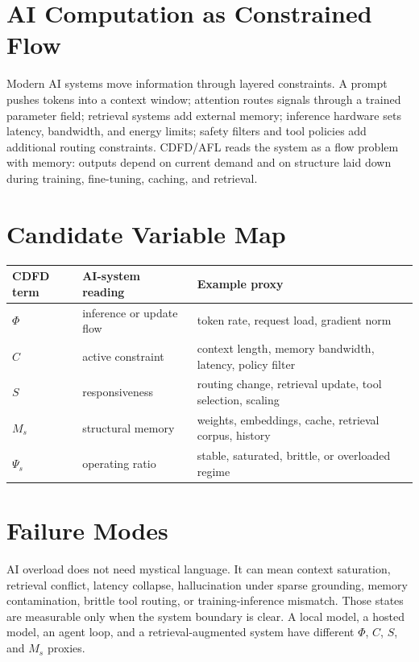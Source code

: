 \documentclass[12pt,a4paper]{article}
\begin{document}
\section{AI Computation as Constrained Flow}

Modern AI systems move information through layered constraints. A prompt pushes
tokens into a context window; attention routes signals through a trained
parameter field; retrieval systems add external memory; inference hardware sets
latency, bandwidth, and energy limits; safety filters and tool policies add
additional routing constraints. CDFD/AFL reads the system as a flow problem with
memory: outputs depend on current demand and on structure laid down during
training, fine-tuning, caching, and retrieval.

\section{Candidate Variable Map}

\begin{table}[h]
\centering
\begin{tabularx}{\textwidth}{@{}lXX@{}}
\toprule
CDFD term & AI-system reading & Example proxy \\
\midrule
$\Phi$ & inference or update flow & token rate, request load, gradient norm \\
$C$ & active constraint & context length, memory bandwidth, latency, policy filter \\
$S$ & responsiveness & routing change, retrieval update, tool selection, scaling \\
$M_s$ & structural memory & weights, embeddings, cache, retrieval corpus, history \\
$\Psi_s$ & operating ratio & stable, saturated, brittle, or overloaded regime \\
\bottomrule
\end{tabularx}
\end{table}

\section{Failure Modes}

AI overload does not need mystical language. It can mean context saturation,
retrieval conflict, latency collapse, hallucination under sparse grounding,
memory contamination, brittle tool routing, or training-inference mismatch.
Those states are measurable only when the system boundary is clear. A local
model, a hosted model, an agent loop, and a retrieval-augmented system have
different $\Phi$, $C$, $S$, and $M_s$ proxies.
\end{document}

